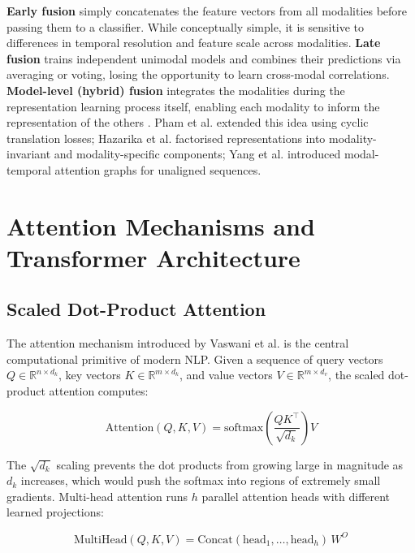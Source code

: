 \textbf{Early fusion} simply concatenates the feature vectors from all modalities before passing them to a classifier. While conceptually simple, it is sensitive to differences in temporal resolution and feature scale across modalities. \textbf{Late fusion} trains independent unimodal models and combines their predictions via averaging or voting, losing the opportunity to learn cross-modal correlations. \textbf{Model-level (hybrid) fusion} integrates the modalities during the representation learning process itself, enabling each modality to inform the representation of the others \cite{tsai2019multimodal}. Pham et al. \cite{pham2019found} extended this idea using cyclic translation losses; Hazarika et al. \cite{hazarika2020misa} factorised representations into modality-invariant and modality-specific components; Yang et al. \cite{yang2021mtag} introduced modal-temporal attention graphs for unaligned sequences.

\section{Attention Mechanisms and Transformer Architecture}

\subsection{Scaled Dot-Product Attention}

The attention mechanism introduced by Vaswani et al. \cite{vaswani2017attention} is the central computational primitive of modern NLP. Given a sequence of query vectors $Q \in \mathbb{R}^{n \times d_k}$, key vectors $K \in \mathbb{R}^{m \times d_k}$, and value vectors $V \in \mathbb{R}^{m \times d_v}$, the scaled dot-product attention computes:

\begin{equation}
\text{Attention}(Q, K, V) = \text{softmax}\left(\frac{QK^\top}{\sqrt{d_k}}\right) V
\label{eq:attention}
\end{equation}

The $\sqrt{d_k}$ scaling prevents the dot products from growing large in magnitude as $d_k$ increases, which would push the softmax into regions of extremely small gradients. Multi-head attention runs $h$ parallel attention heads with different learned projections:

\begin{equation}
\text{MultiHead}(Q, K, V) = \text{Concat}(\text{head}_1, \ldots, \text{head}_h)\,W^O
\label{eq:multihead}
\end{equation}

